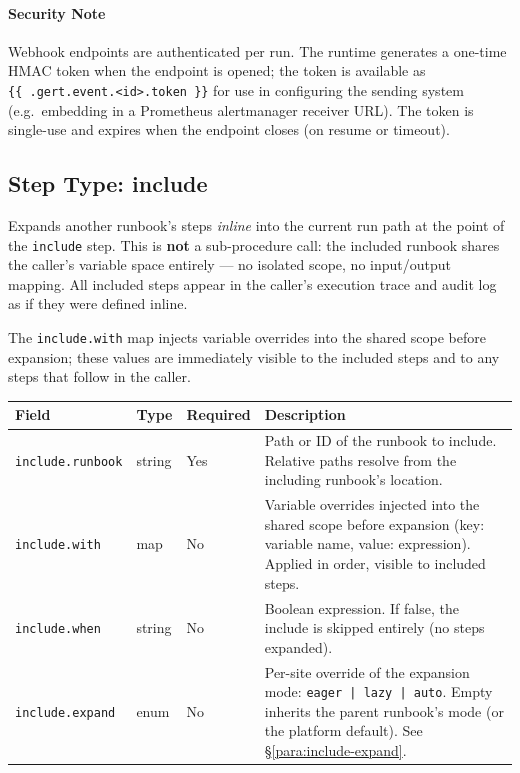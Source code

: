 \paragraph{Security Note}

Webhook endpoints are authenticated per run.  The runtime generates a one-time
HMAC token when the endpoint is opened; the token is available as
\texttt{\{\{\ .gert.event.<id>.token\ \}\}} for use in configuring the sending
system (e.g.\ embedding in a Prometheus alertmanager receiver URL).  The token
is single-use and expires when the endpoint closes (on resume or timeout).

\subsection{Step Type: include}
\label{subsec:step-include}

Expands another runbook's steps \emph{inline} into the current run path at the
point of the \texttt{include} step.  This is \textbf{not} a sub-procedure call:
the included runbook shares the caller's variable space entirely — no isolated
scope, no input/output mapping.  All included steps appear in the caller's
execution trace and audit log as if they were defined inline.

The \texttt{include.with} map injects variable overrides into the shared scope
before expansion; these values are immediately visible to the included steps and
to any steps that follow in the caller.

\begin{center}
\begin{tabular}{lllp{5.5cm}}
\hline
\textbf{Field} & \textbf{Type} & \textbf{Required} & \textbf{Description} \\
\hline
\texttt{include.runbook}  & string & Yes & Path or ID of the runbook to include. Relative paths resolve from the including runbook's location. \\
\texttt{include.with}     & map    & No  & Variable overrides injected into the shared scope before expansion (key: variable name, value: expression). Applied in order, visible to included steps. \\
\texttt{include.when}     & string & No  & Boolean expression. If false, the include is skipped entirely (no steps expanded). \\
\texttt{include.expand}   & enum   & No  & Per-site override of the expansion mode: \texttt{eager | lazy | auto}. Empty inherits the parent runbook's mode (or the platform default). See \S\ref{para:include-expand}. \\
\hline
\end{tabular}
\end{center}

